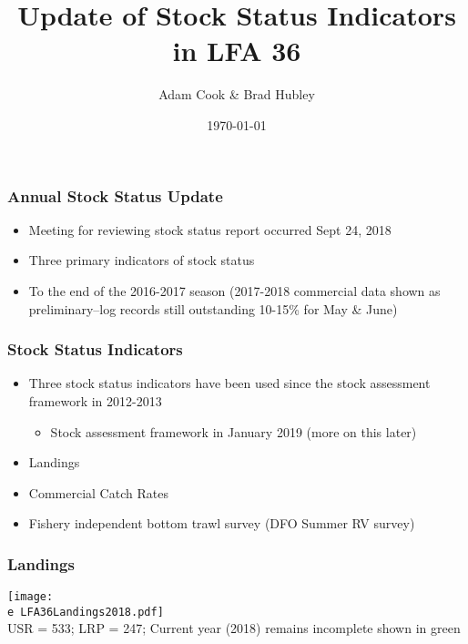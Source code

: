 \documentclass{beamer}
\title[LFA 36 American Lobster]{Update of Stock Status Indicators in LFA 36\\ }
\author{Adam Cook \& Brad Hubley} %
\institute[Population Ecology Division]
{Bedford Institute of Oceanography \\ %
\medskip
\textit{Adam.Cook@dfo-mpo.gc.ca} %
}
\date{\today} %
\newcommand{\e}{/SpinDr/backup/bio_data/bio.lobster/figures/}
\begin{document}
\begin{frame}
	\titlepage %

\end{frame}


%
\begin{frame}
\frametitle{Annual Stock Status Update}
%
\begin{itemize}
	\item Meeting for reviewing stock status report occurred Sept 24, 2018
	\item Three primary indicators of stock status 
	\item To the end of the 2016-2017 season (2017-2018 commercial data shown as preliminary--log records still outstanding 10-15\% for May \& June)
\end{itemize}

\end{frame}

\begin{frame}

	\frametitle{Stock Status Indicators}

	\begin{itemize}
		\item Three stock status indicators have been used since the stock assessment framework in 2012-2013
		\begin{itemize}
			\item Stock assessment framework in January 2019 (more on this later)
		\end{itemize}
		\item Landings
		\item Commercial Catch Rates
		\item Fishery independent bottom trawl survey (DFO Summer RV survey)
	\end{itemize}


\end{frame}


\begin{frame}
\frametitle{Landings}
%
	\centering
	  \texttt{[image: \\e LFA36Landings2018.pdf]}\\[-1ex]
	{\tiny{USR = 533; LRP = 247; Current year (2018) remains incomplete shown in green}}


\end{frame}
\end{document}
